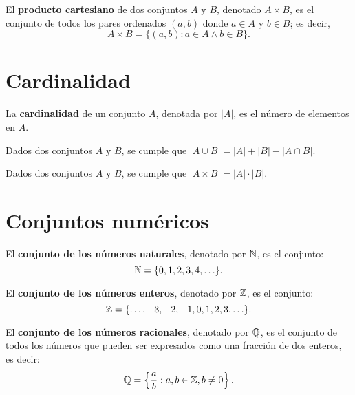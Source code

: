 \documentclass[a4,11pt]{aleph-notas}
\begin{document}
\begin{defi}
    El \textbf{producto cartesiano} de dos conjuntos $A$ y $B$, denotado $A \times B$, es el conjunto de todos los pares ordenados $(a, b)$ donde $a \in A$ y $b \in B$; es decir,
    \[
        A \times B = \{(a, b) : a \in A \land b \in B\}.
    \]
\end{defi}


\section{Cardinalidad}

\begin{defi}[Cardinalidad]
    La \textbf{cardinalidad} de un conjunto $A$, denotada por $|A|$, es el número de elementos en $A$.
\end{defi}

\begin{teo}
    Dados dos conjuntos $A$ y $B$, se cumple que $|A \cup B| = |A| + |B| - |A \cap B|$.
\end{teo}

\begin{teo}
    Dados dos conjuntos $A$ y $B$, se cumple que $|A \times B| = |A| \cdot |B|$.
\end{teo}


\section{Conjuntos numéricos}

\begin{defi}
    El \textbf{conjunto de los números naturales}, denotado por $\mathbb{N}$, es el conjunto:
    \[
        \mathbb{N} = \{0, 1, 2, 3, 4, \ldots\}.
    \]
\end{defi}

\begin{defi}
    El \textbf{conjunto de los números enteros}, denotado por $\mathbb{Z}$, es el conjunto:
    \[
        \mathbb{Z} = \{\ldots, -3, -2, -1, 0, 1, 2, 3, \ldots\}.
    \]
\end{defi}

\begin{defi}
    El \textbf{conjunto de los números racionales}, denotado por $\mathbb{Q}$, es el conjunto de todos los números que pueden ser expresados como una fracción de dos enteros, es decir:
    \[
        \mathbb{Q} = \left\{ \frac{a}{b} : a, b \in \mathbb{Z}, b \neq 0 \right\}.
    \]
\end{defi}
\end{document}
